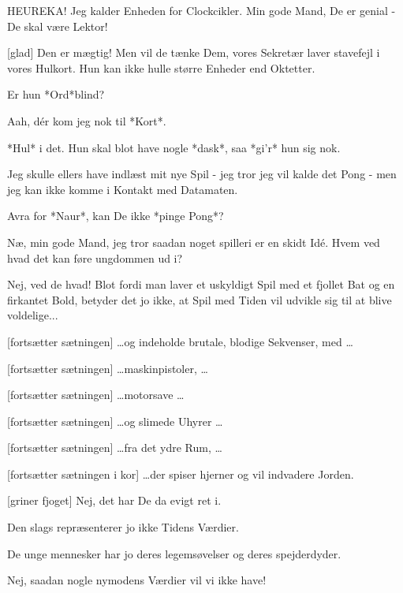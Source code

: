 \documentclass[a4paper,12pt]{article}
\begin{document}
\begin{sketch}
 HEUREKA! Jeg kalder Enheden for Clockcikler. Min gode Mand,
De er genial - De skal være Lektor!

[glad] Den er mægtig! Men vil de tænke Dem, vores Sekretær
laver stavefejl i vores Hulkort. Hun kan ikke hulle større Enheder end
Oktetter.

 Er hun *Ord*blind?

 Aah, dér kom jeg nok til *Kort*.

 *Hul* i det. Hun skal blot have nogle *dask*, saa *gi'r* hun
sig nok.


 Jeg skulle ellers have indlæst mit nye Spil - jeg tror jeg
vil kalde det Pong - men jeg kan ikke komme i Kontakt med Datamaten.

 Avra for *Naur*, kan De ikke *pinge Pong*?

 Næ, min gode Mand, jeg tror saadan noget spilleri er en skidt
Idé. Hvem ved hvad det kan føre ungdommen ud i?

 Nej, ved de hvad! Blot fordi man laver et uskyldigt Spil med
et fjollet Bat og en firkantet Bold, betyder det jo ikke, at Spil med
Tiden vil udvikle sig til at blive voldelige...

[fortsætter sætningen] \ldots og indeholde brutale, blodige
Sekvenser, med \ldots

[fortsætter sætningen] \ldots maskinpistoler, \ldots

[fortsætter sætningen] \ldots motorsave \ldots

[fortsætter sætningen] \ldots og slimede Uhyrer \ldots

[fortsætter sætningen] \ldots fra det ydre Rum, \ldots

[fortsætter sætningen i kor] \ldots der spiser hjerner og vil
indvadere Jorden.


[griner fjoget] Nej, det har De da evigt ret i.

 Den slags repræsenterer jo ikke Tidens Værdier.

 De unge mennesker har jo deres legemsøvelser og deres spejderdyder.

 Nej, saadan 
nogle nymodens Værdier vil vi ikke have!



\end{sketch}
\end{document}
